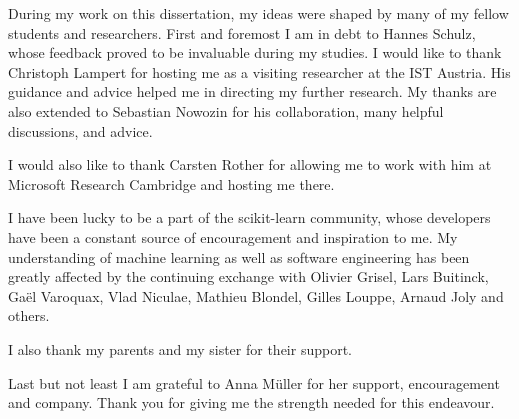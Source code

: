 \documentclass[12pt,toc=bibnumbered, a4paper,twoside,DIV=11,BCOR=.5cm]{scrbook}
\begin{document}
During my work on this dissertation, my ideas were shaped by many of my fellow
students and researchers. First and foremost I am in debt to Hannes Schulz,
whose feedback proved to be invaluable during my studies.
I would like to thank Christoph Lampert for hosting me as a visiting researcher
at the IST Austria. His guidance and advice helped me in directing my further
research. My thanks are also extended to Sebastian Nowozin for his collaboration,
many helpful discussions, and advice.

I would also like to thank Carsten Rother for allowing me to work with him
at Microsoft Research Cambridge and hosting me there.

I have been lucky to be a part of the scikit-learn community, whose developers
have been a constant source of encouragement and inspiration to me. My
understanding of machine learning as well as software engineering has been
greatly affected by the continuing exchange with Olivier Grisel, Lars Buitinck,
Ga\"el Varoquax, Vlad Niculae, Mathieu Blondel, Gilles Louppe, Arnaud Joly and
others.

I also thank my parents and my sister for their support.

Last but not least I am grateful to Anna M\"uller for her support,
encouragement and company. Thank you for giving me the strength needed for this
endeavour.
\cleardoublepage
{}


%












\end{document}
